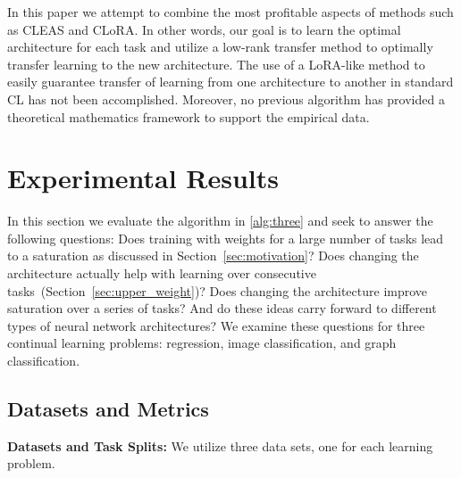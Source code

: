 In this paper we attempt to combine the most profitable aspects of methods such as CLEAS and CLoRA. In other words, our goal is to learn the optimal architecture for each task and utilize a low-rank transfer method to optimally transfer learning to the new architecture. The use of a LoRA-like method to easily guarantee transfer of learning from one architecture to another in standard CL has not been accomplished. Moreover, no previous algorithm has provided a theoretical mathematics framework to support the empirical data. 

\section{Experimental Results}\label{sec: experiments}
In this section we evaluate the algorithm in \ref{alg:three} and seek to answer the following questions: Does training with weights for a large number of tasks lead to a saturation as discussed in Section~\ref{sec:motivation}? Does changing the architecture actually help with learning over consecutive tasks~(Section~\ref{sec:upper_weight})? Does changing the architecture improve saturation over a series of tasks? And do these ideas carry forward to different types of neural network architectures? We examine these questions for three continual learning problems: regression, image classification, and graph classification.

\subsection{Datasets and Metrics}

\textbf{Datasets and Task Splits:} We utilize three data sets, one for each learning problem.

